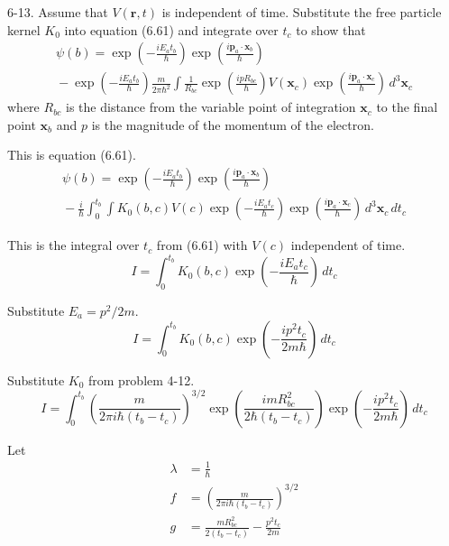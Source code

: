 \documentclass[12pt]{article}
\begin{document}
6-13.
Assume that $V(\mathbf r,t)$ is independent of time.
Substitute the free particle kernel $K_0$ into equation
(6.61) and integrate over $t_c$ to show that
\begin{multline*}
\psi(b)=
\exp\left(-\frac{iE_at_b}{\hbar}\right)
\exp\left(\frac{i\mathbf p_a\cdot\mathbf x_b}{\hbar}\right)
\\
{}-\exp\left(-\frac{iE_at_b}{\hbar}\right)
\frac{m}{2\pi\hbar^2}
\int
\frac{1}{R_{bc}}
\exp\left(\frac{ipR_{bc}}{\hbar}\right)
V(\mathbf x_c)
\exp\left(\frac{i\mathbf p_a\cdot\mathbf x_c}{\hbar}\right)
\,d^3\mathbf x_c
\tag{6.62}
\end{multline*}
where $R_{bc}$ is the distance from the variable point of integration
$\mathbf x_c$ to the final point $\mathbf x_b$ and $p$ is the
magnitude of the momentum of the electron.

\bigskip
This is equation (6.61).
\begin{multline*}
\psi(b)=
\exp\left(-\frac{iE_at_b}{\hbar}\right)
\exp\left(\frac{i\mathbf p_a\cdot\mathbf x_b}{\hbar}\right)
\\
{}-\frac{i}{\hbar}\int_0^{t_b}\int
K_0(b,c)V(c)
\exp\left(-\frac{iE_at_c}{\hbar}\right)
\exp\left(\frac{i\mathbf p_a\cdot\mathbf x_c}{\hbar}\right)
\,d^3\mathbf x_c\,dt_c
\tag{6.61}
\end{multline*}

This is the integral over $t_c$ from (6.61) with $V(c)$ independent of time.
\begin{equation*}
I=\int_0^{t_b}K_0(b,c)
\exp\left(-\frac{iE_at_c}{\hbar}\right)
\,dt_c
\end{equation*}

Substitute $E_a=p^2/2m$.
\begin{equation*}
I=\int_0^{t_b}K_0(b,c)
\exp\left(-\frac{ip^2t_c}{2m\hbar}\right)
\,dt_c
\end{equation*}

Substitute $K_0$ from problem 4-12.
\begin{equation*}
I=\int_0^{t_b}
\left(\frac{m}{2\pi i\hbar(t_b-t_c)}\right)^{3/2}
\exp\left(\frac{imR_{bc}^2}{2\hbar(t_b-t_c)}\right)
\exp\left(-\frac{ip^2t_c}{2m\hbar}\right)
\,dt_c
\end{equation*}

Let
\begin{align*}
\lambda&=\frac{1}{\hbar}
\\
f&=\left(\frac{m}{2\pi i\hbar(t_b-t_c)}\right)^{3/2}
\\
g&=\frac{m R_{bc}^2}{2(t_b-t_c)}-\frac{p^2t_c}{2m}
\end{align*}
\end{document}
